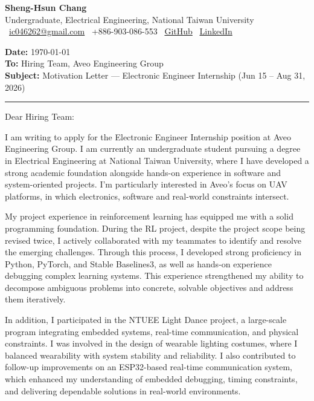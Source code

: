 \documentclass[12pt,a4paper]{article}
\makeatletter
\newcommand{\Name}{Sheng-Hsun Chang}
\newcommand{\Email}{\href{mailto:ic046262@gmail.com}{ic046262@gmail.com}}
\newcommand{\Phone}{+886-903-086-553}
\newcommand{\GitHub}{\href{https://github.com/}{GitHub}}
\newcommand{\LinkedIn}{\href{https://www.linkedin.com/}{LinkedIn}}
\makeatother
\begin{document}
{\LARGE \textbf{\Name}}\\
Undergraduate, Electrical Engineering, National Taiwan University\\
\vspace{2pt}
\faEnvelope\ \Email \quad
\faPhone\ \Phone \quad
\faGithub\ \GitHub \quad
\faLinkedin\ \LinkedIn

\vspace{14pt}

\textbf{Date:} \today\\
\textbf{To:} Hiring Team, Aveo Engineering Group\\
\textbf{Subject:} Motivation Letter --- Electronic Engineer Internship (Jun 15 -- Aug 31, 2026)


\vspace{10pt}
\hrule
Dear Hiring Team:

I am writing to apply for the Electronic Engineer Internship position at Aveo Engineering Group. 
I am currently an undergraduate student pursuing a degree in Electrical Engineering at 
National Taiwan University, where I have developed a strong academic foundation alongside 
hands-on experience in software and system-oriented projects. I'm particularly interested in
Aveo's focus on UAV platforms, in which electronics, software and real-world constraints
intersect. 

My project experience in reinforcement learning has equipped me with a solid programming foundation. 
During the RL project, despite the project scope being revised twice, I actively collaborated with my teammates to identify and resolve the emerging challenges. Through this process, I developed strong proficiency in Python, PyTorch, and Stable Baselines3, 
as well as hands-on experience debugging complex learning systems. 
This experience strengthened my ability to decompose ambiguous problems into concrete, solvable objectives and address them iteratively. 

In addition, I participated in the NTUEE Light Dance project, a large-scale 
program integrating embedded systems, real-time communication, and physical constraints.
I was involved in the design of wearable lighting costumes, where I balanced wearability
with system stability and reliability. I also contributed to follow-up improvements on an
ESP32-based real-time communication system, which enhanced my understanding of embedded
debugging, timing constraints, and delivering dependable solutions in real-world environments.
\end{document}
